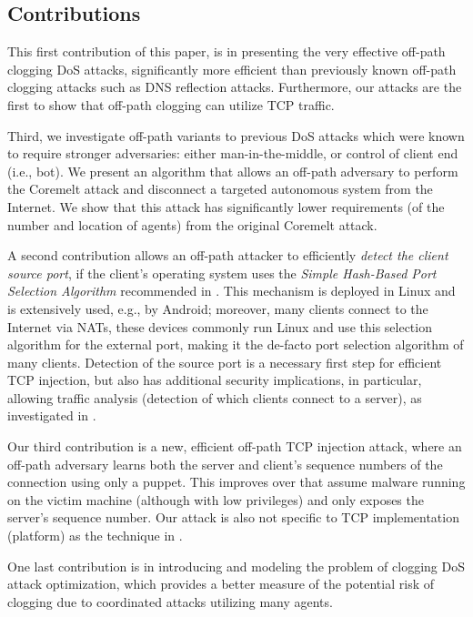 \documentclass[conference]{IEEEtran}
\begin{document}
\subsection{Contributions}
This first contribution of this paper, is in presenting the very effective off-path clogging DoS attacks, significantly more efficient than previously known off-path clogging attacks such as DNS reflection attacks. Furthermore, our attacks are the first to show that off-path clogging can utilize TCP traffic. 

Third, we investigate off-path variants to previous DoS attacks which were known to require stronger adversaries: either man-in-the-middle, or control of client end (i.e., bot). We present an algorithm that allows an off-path adversary to perform the Coremelt attack and disconnect a targeted autonomous system from the Internet. We show that this attack has significantly lower requirements (of the number and location of agents) from the original Coremelt attack.

A second contribution allows an off-path attacker to efficiently {\em detect the client source port}, if the client's operating system uses the {\em Simple Hash-Based Port Selection Algorithm} recommended in \cite{rfc6056}. This mechanism is deployed in Linux and is extensively used, e.g., by Android; moreover, many clients connect to the Internet via NATs, these devices commonly run Linux and use this selection algorithm for the external port, making it the de-facto port selection algorithm of many clients. Detection of the source port is a necessary first step for efficient TCP injection, but also has additional security implications, in particular, allowing traffic analysis (detection of which clients connect to a server), as investigated in \cite{SpyingInTheDark}. 



Our third contribution is a new, efficient off-path TCP injection attack, where an off-path adversary learns both the server and client's sequence numbers of the connection using only a puppet. This improves over \cite{snptcp,CCS12:tcp} that assume malware running on the victim machine (although with low privileges) and only exposes the server's sequence number. Our attack is also not specific to TCP implementation (platform) as the technique in \cite{woottcp}.

One last contribution is in introducing and modeling the problem of clogging DoS attack optimization, which provides a better measure of the potential risk of clogging due to coordinated attacks utilizing many agents. 
\end{document}
